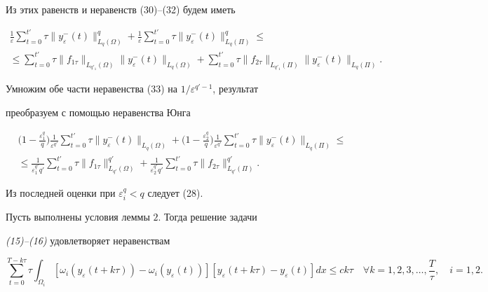 \begin{pf}
Из этих равенств и неравенств (30)--(32) будем иметь 


\begin{multline} 


\frac{1}{\varepsilon}\sum^{t'}_{t=0}\tau 


\|y_\varepsilon^-(t)\|^q_{L_q(\Omega)} + 


\frac{1}{\varepsilon}\sum^{t'}_{t=0}\tau 


\|y_\varepsilon^-(t)\|^q_{L_q(\Pi)} \le\\ 


\le \sum^{t'}_{t=0}\tau\|f_{1\tau}\|_{L_{q'_1}(\Omega)}


\|y_\varepsilon^-(t)\|_{L_q(\Omega)}+ 


\sum^{t'}_{t=0}\tau\|f_{2\tau}\|_{L_{q'_1}(\Pi)}


\|y_\varepsilon^-(t)\|_{L_q(\Pi)}. 


\end{multline} 


Умножим обе части неравенства (33) на $1/\varepsilon^{q'-1}$, результат 


преобразуем с помощью неравенства Юнга 


\begin{multline*} 


\bigl(1-\frac{\varepsilon^q_1}{q}\bigr)\frac{1}{\varepsilon^{q'}} 


\sum^{t'}_{t=0}\tau\|y_\varepsilon^-(t)\|_{L_q(\Omega)} +


\bigl(1-\frac{\varepsilon^q_2}{q}\bigr)\frac{1}{\varepsilon^{q'}} 


\sum^{t'}_{t=0}\tau\|y_\varepsilon^-(t)\|_{L_q(\Pi)} \le\\ 


\le \frac{1}{\varepsilon^{q'}_1 q'}


\sum^{t'}_{t=0}\tau\|f_{1\tau}\|^{q'}_{L_{q'}(\Omega)} + 


\frac{1}{\varepsilon^{q'}_2 q'}


\sum^{t'}_{t=0}\tau\|f_{2\tau}\|^{q'}_{L_{q'}(\Pi)}.


\end{multline*} 


Из последней оценки при $\varepsilon^q_i<q$ следует (28).


\end{pf} 


\begin{lem} 


Пусть выполнены условия леммы $2$. Тогда решение задачи


{\em (15)--(16)} удовлетворяет неравенствам 


\begin{equation} 


\sum^{T-k\tau}_{t=0}\tau\int_{\Omega_i}[\omega_i(y_\varepsilon(t+k\tau))- 


\omega_i(y_\varepsilon(t))][y_\varepsilon(t+k\tau)-y_\varepsilon(t)]dx \le 


ck\tau \quad \forall k=1,2,3,\dotsc,\frac{T}{\tau}, \quad i=1,2. 


\end{equation} 


\end{lem} 



